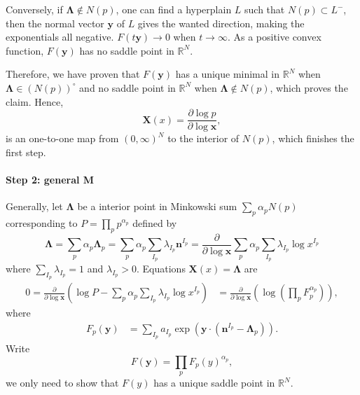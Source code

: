 \documentclass[12pt]{article}
\theoremstyle{definition}
\theoremstyle{plain}
\begin{document}
\begin{figure}[htbp]
\centering
{}


 

\end{figure}
Conversely, if $\mathbf\Lambda \not\in N(p)$, one can find a hyperplain $L$ such that $N(p)\subset L^-$, then the normal vector $\mathbf{y}$ of $L$ gives the wanted direction, making the exponentials all negative. $F(t\mathbf y)\to 0$ when $t\to \infty$. As a positive convex function, $F(\mathbf y)$ has no saddle point in $\mathbb R^N$.



Therefore, we have proven that $F(\mathbf y)$ has a unique minimal in $\mathbb R^N$ when $\mathbf \Lambda \in (N(p))^\circ$ and no saddle point in $\mathbb R^N$ when $\mathbf \Lambda \not\in N(p)$, which proves the claim. Hence, 
\[
	\mathbf X(x)=\frac{\partial \log p}{\partial \log \mathbf x},
\]
is an one-to-one map from $(0,\infty)^N$ to the interior of $N(p)$, which finishes the first step.



\paragraph{Step 2: general M}
Generally, let $\mathbf{\Lambda}$ be a interior point in Minkowski sum $\sum_p \alpha_p N(p)$ corresponding to $P=\prod_p p^{\alpha_p}$ defined by 
\[
	\mathbf{\Lambda}
	=\sum_p \alpha_p \mathbf{\Lambda}_p
	=\sum_p \alpha_p \sum_{I_p}\lambda_{I_p}\mathbf{n}^{I_p}
	=\frac{\partial}{\partial \log \mathbf{x}}\sum_{p}\alpha_p\sum_{I_p}\lambda_{I_p} \log x^{I_p}
\]
where $\sum_{I_p} \lambda_{I_p}=1$ and $\lambda_{I_p} > 0$. Equations $\mathbf{X}(x)=\mathbf{\Lambda}$ are 
\[
\begin{aligned}
	0=\frac{\partial }{\partial \log \mathbf{x}}\left(
	\log P-\sum_{p}\alpha_p\sum_{I_p}\lambda_{I_p} \log x^{I_p}
	\right)&=\frac{\partial }{\partial \log \mathbf{x}}\left(
	\log \left(\prod_p F_p^{\alpha_p}\right)
	\right),
\end{aligned}
\]
where
\[
	\begin{aligned}
		F_p(\mathbf y)&=\sum_{I_p} a_{I_p} \exp\left(\mathbf{y}\cdot \left(\mathbf{n}^{I_p}-\mathbf{\Lambda}_p\right)\right).
	\end{aligned}
\]
Write
\[
	F(\mathbf y)=\prod_p F_p(y)^{\alpha_p},
\]
we only need to show that $F(y)$ has a unique saddle point in $\mathbb R^N$.
\end{document}
